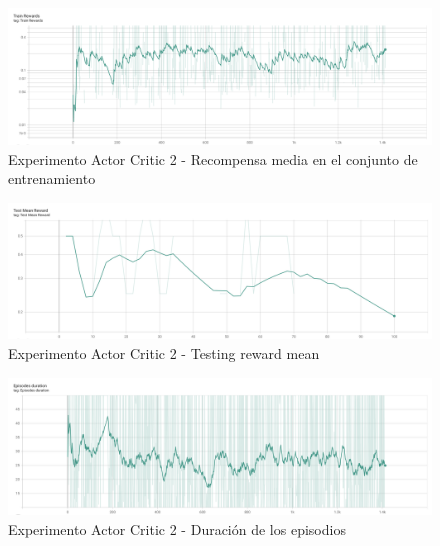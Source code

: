 \begin{figure}[H]
	\centering
	\includegraphics[width=1\textwidth]{figuras/experiments/actor_critic/actor_critic_no_rewards_till_complete/train_rewards.png}
	\caption[Experimento Actor Critic 2 - Recompensa media en el conjunto de entrenamiento]{Experimento Actor Critic 2 - Recompensa media en el conjunto de entrenamiento}
	\label{fig-experimento-actor-critic-2-training-reward-mean}
\end{figure}
\begin{figure}[H]
	\centering
	\includegraphics[width=1\textwidth]{figuras/experiments/actor_critic/actor_critic_no_rewards_till_complete/test_mean_reward.png}
	\caption[Experimento Actor Critic 2 - Testing reward mean]{Experimento Actor Critic 2 - Testing reward mean}
	\label{fig-experimento-actor-critic-2-testing-reward-mean}
\end{figure}
\begin{figure}[H]
	\centering
	\includegraphics[width=1\textwidth]{figuras/experiments/actor_critic/actor_critic_no_rewards_till_complete/episodes_duration.png}
	\caption[Experimento Actor Critic 2 - Duración de los episodios]{Experimento Actor Critic 2 - Duración de los episodios}
	\label{fig-experimento-actor-critic-2-episodes-duration}
\end{figure}
